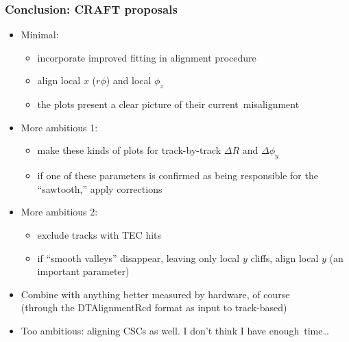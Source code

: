 \documentclass[compress]{beamer}
\begin{document}

\begin{frame}
\frametitle{Conclusion: CRAFT proposals}
\begin{itemize}
\item Minimal:
\begin{itemize}
\item incorporate improved fitting in alignment procedure
\item align local $x$ ($r\phi$) and local $\phi_z$ \\
\item the plots present a clear picture of their \mbox{current misalignment\hspace{-1 cm}}
\end{itemize}

\item More ambitious 1:
\begin{itemize}
\item make these kinds of plots for track-by-track $\Delta R$ and
  $\Delta \phi_y$
\item if one of these parameters is confirmed as being responsible for the ``sawtooth,'' apply corrections
\end{itemize}

\item More ambitious 2:
\begin{itemize}
\item exclude tracks with TEC hits
\item if ``smooth valleys'' disappear, leaving only local $y$ cliffs, align local $y$ (an important parameter)
\end{itemize}

\item Combine with anything better measured by hardware, of course \\
(through the DTAlignmentRcd format as input to track-based)

\item Too ambitious: aligning CSCs as well.  I don't think I have \mbox{enough time\ldots\hspace{-1 cm}}
\end{itemize}
\label{numpages}
\end{frame}
\end{document}
